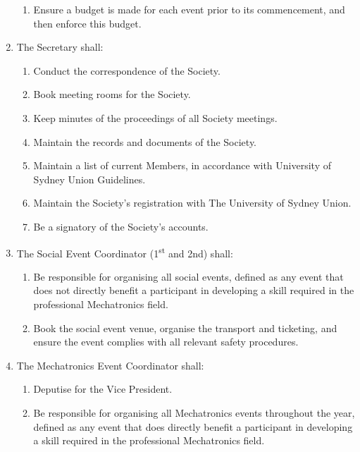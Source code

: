 \documentclass[11pt]{article}
\begin{document}
\begin{enumerate}[\thesection .1]
\begin{enumerate}
        \item Ensure a budget is made for each event prior to its commencement, and then enforce this budget.
    \end{enumerate}
    \item The Secretary shall:
    \begin{enumerate}
        \item Conduct the correspondence of the Society.
        \item Book meeting rooms for the Society.
        \item Keep minutes of the proceedings of all Society meetings.
        \item Maintain the records and documents of the Society.
        \item Maintain a list of current Members, in accordance with University of Sydney Union Guidelines.
        \item Maintain the Society’s registration with The University of Sydney Union.
        \item Be a signatory of the Society’s accounts.
    \end{enumerate}
    \item The Social Event Coordinator (1\textsuperscript{st} and 2nd) shall:
    \begin{enumerate}
        \item Be responsible for organising all social events, defined as any event that does not directly benefit a participant in developing a skill required in the professional Mechatronics field.
        \item Book the social event venue, organise the transport and ticketing, and ensure the event complies with all relevant safety procedures.
    \end{enumerate}
    \item The Mechatronics Event Coordinator shall:
    \begin{enumerate}
        \item Deputise for the Vice President.
        \item Be responsible for organising all Mechatronics events throughout the year, defined as any event that does directly benefit a participant in developing a skill required in the professional Mechatronics field.

\end{enumerate}
\end{enumerate}
\end{document}
